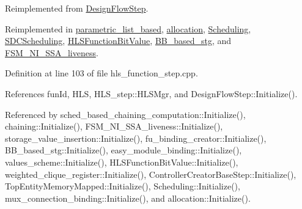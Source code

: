 Reimplemented from \hyperlink{classDesignFlowStep_a44b50683382a094976e1d432a7784799}{Design\+Flow\+Step}.



Reimplemented in \hyperlink{classparametric__list__based_a33b5a6aadaf0f36b342b434126ebbf79}{parametric\+\_\+list\+\_\+based}, \hyperlink{classallocation_a448e4e0cc7e3444fb3479f211d0b637e}{allocation}, \hyperlink{classScheduling_a178619eced00400e3a023a0b32784f8d}{Scheduling}, \hyperlink{classSDCScheduling_a6776ee26349c16c789a5b2c33c1fa9ff}{S\+D\+C\+Scheduling}, \hyperlink{classHLSFunctionBitValue_aded992799d0c15347a1012e90ebd914a}{H\+L\+S\+Function\+Bit\+Value}, \hyperlink{classBB__based__stg_a68123e6fdc9a397be06ee3058e217ff0}{B\+B\+\_\+based\+\_\+stg}, and \hyperlink{classFSM__NI__SSA__liveness_a36cbd84735c2126d760d7fbdadab9d5e}{F\+S\+M\+\_\+\+N\+I\+\_\+\+S\+S\+A\+\_\+liveness}.



Definition at line 103 of file hls\+\_\+function\+\_\+step.\+cpp.



References fun\+Id, H\+LS, H\+L\+S\+\_\+step\+::\+H\+L\+S\+Mgr, and Design\+Flow\+Step\+::\+Initialize().



Referenced by sched\+\_\+based\+\_\+chaining\+\_\+computation\+::\+Initialize(), chaining\+::\+Initialize(), F\+S\+M\+\_\+\+N\+I\+\_\+\+S\+S\+A\+\_\+liveness\+::\+Initialize(), storage\+\_\+value\+\_\+insertion\+::\+Initialize(), fu\+\_\+binding\+\_\+creator\+::\+Initialize(), B\+B\+\_\+based\+\_\+stg\+::\+Initialize(), easy\+\_\+module\+\_\+binding\+::\+Initialize(), values\+\_\+scheme\+::\+Initialize(), H\+L\+S\+Function\+Bit\+Value\+::\+Initialize(), weighted\+\_\+clique\+\_\+register\+::\+Initialize(), Controller\+Creator\+Base\+Step\+::\+Initialize(), Top\+Entity\+Memory\+Mapped\+::\+Initialize(), Scheduling\+::\+Initialize(), mux\+\_\+connection\+\_\+binding\+::\+Initialize(), and allocation\+::\+Initialize().

